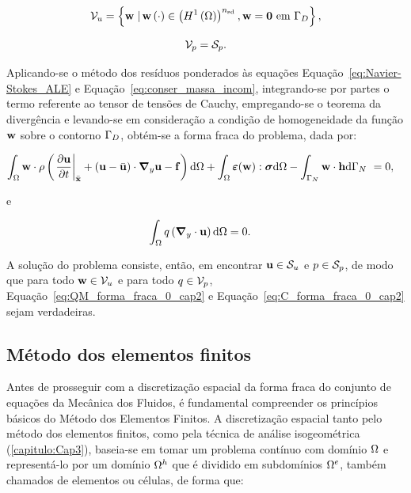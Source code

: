 \begin{align}
\mathcal{V}_u = \left\{\mathbf{w} \left . \right| \mathbf{w} \left(\cdot\right) \in \left(H^{1}\left(\Omega\right)\right)^{{n_{\mathrm{sd}}}}, \mathbf{w} = \mathbf{0} \textrm { em} \ \Gamma_{D} \right\},
\end{align}

\begin{align}
\mathcal{V}_p = \mathcal{S}_p.
\end{align}

Aplicando-se o método dos resíduos ponderados às equações Equação~\eqref{eq:Navier-Stokes_ALE} e Equação~\eqref{eq:conser_massa_incom}, integrando-se por partes o termo referente ao tensor de tensões de Cauchy, empregando-se o teorema da divergência e levando-se em consideração a condição de homogeneidade da função $\mathbf{w}$ sobre o contorno $\Gamma_{D}$, obtém-se a forma fraca do problema, dada por:

\begin{align}
\int_{\Omega} \mathbf{w} \cdot \rho  \left(\left . \frac{\partial\mathbf{u}}{\partial t} \right|_{\bar{\mathbf{x}}} + \left(\mathbf{u} - \bar{\mathbf{u}} \right)\cdot\boldsymbol{\nabla}_y \mathbf{u} - \mathbf{f} \right) \mathrm{d} \Omega + \int_{\Omega} \bm{\varepsilon}(\mathbf{w}) : \boldsymbol{\sigma}  \mathrm{d} \Omega - \int_{\Gamma_{N}} \mathbf{w} \cdot \mathbf{h} \mathrm{d}\Gamma_{N}  \  &= 0,  \label{eq:QM_forma_fraca_0_cap2} 
\end{align}

\noindent e

\begin{align}
\int_{\Omega} q \left(\boldsymbol{\nabla}_y \cdot \mathbf{u}\right) \mathrm{d} \Omega &= 0. \label{eq:C_forma_fraca_0_cap2} 
\end{align}

A solução do problema consiste, então, em encontrar $\mathbf{u} \in \mathcal{S}_u$ e $p \in \mathcal{S}_p$, de modo que para todo $\mathbf{w} \in \mathcal{V}_u$ e para todo $q \in \mathcal{V}_p$, Equação~\eqref{eq:QM_forma_fraca_0_cap2} e Equação~\eqref{eq:C_forma_fraca_0_cap2} sejam verdadeiras.

\subsection{Método dos elementos finitos } \label{capitulo:Cap2:FormaFraca:ElementosFinitos}

Antes de prosseguir com a discretização espacial da forma fraca do conjunto de equações da Mecânica dos Fluidos, é fundamental compreender os princípios básicos do Método dos Elementos Finitos.  A discretização espacial tanto pelo método dos elementos finitos, como pela técnica de análise isogeométrica (\autoref{capitulo:Cap3}), baseia-se em tomar um problema contínuo com domínio $\Omega$ e representá-lo por um domínio $\Omega^h$ que é dividido em subdomínios $\Omega^e$, também chamados de elementos ou células, de forma que:

